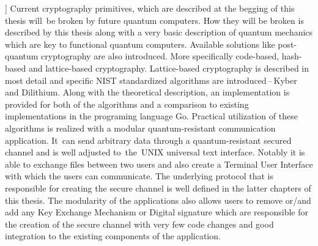 ]{%
  Current cryptography primitives, which are described at the begging of this thesis will~be broken by future quantum computers. How they will be broken is described by this thesis along with a very basic description of quantum mechanics which are key to functional quantum computers. Available solutions like post-quantum cryptography are also introduced. More specifically code-based, hash-based and lattice-based cryptography. Lattice-based cryptography is described in most detail and specific NIST standardized algorithms are introduced\,--\,Kyber and Dilithium. Along with the theoretical description, an implementation is provided for both of the algorithms and a comparison to existing implementations in the programing language Go. Practical utilization of these algorithms is realized with a modular quantum-resistant communication application. It~can send arbitrary data through a quantum-resistant secured channel and is well adjusted to~the~UNIX universal text interface. Notably it is able to exchange files between two users and also create a Terminal User Interface with which the users can communicate. The underlying protocol that is responsible for creating the secure channel is well defined in the latter chapters of this thesis. The modularity of the applications also allows users to remove or/and add any Key Exchange Mechanism or Digital signature which are responsible for the creation of the secure channel with very few code changes and good integration to the existing components of the application.
}


%
